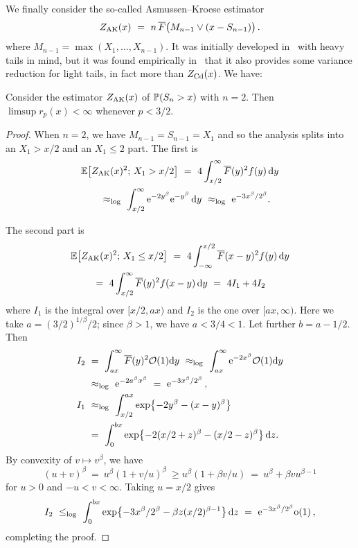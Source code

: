 We finally consider the so-called Asmussen--Kroese estimator
\begin{equation}\label{asmussen2006improved}
Z_{\rm AK}(x)\ =\ n\,\overline F\bigl(M_{n-1}\vee(x-S_{n-1})\bigr)\,.
\end{equation}
where $M_{n-1}=\max(X_1,\ldots,X_{n-1})$. It was initially developed in~\cite{asmussen2006improved} with heavy tails
in mind, but it was found empirically in~\cite{asmussen2017conditional} that it also provides some
variance reduction for light tails, in fact more than $Z_{\rm Cd}(x)$. We have:\\
\begin{proposition}\label{Prop:SA7.2b} Consider the 
estimator $Z_{\rm AK}(x)$ of $\mathbb{P}(S_n>x)$ with $n=2$. Then
$\limsup r_p(x)<\infty$ whenever $p<3/2$. 
\end{proposition}
\begin{proof} When $n=2$, we have $M_{n-1}=S_{n-1}=X_1$ and so the analysis
splits into an $X_1>x/2$ and an $X_1\le 2$ part. The first is
\begin{align*}\MoveEqLeft
 \Exp\bigl[Z_{\rm AK}(x)^2;\,X_1>x/2\bigr]\ =\ 4\int_{x/2}^\infty
 \Fb(y)^2f(y)\,\dd y\\ & \approx_{\log}\ \int_{x/2}^\infty
\e^{-2y^\beta}\e^{-y^\beta}\,\dd y\  \approx_{\log}\ \e^{-3x^\beta/2^\beta}.
\end{align*}

The second part is
\begin{align*}\MoveEqLeft
 \Exp\bigl[Z_{\rm AK}(x)^2;\,X_1\le x/2\bigr]\ =\ 4\int_{-\infty}^{x/2}
 \Fb(x-y)^2f(y)\,\dd y\\ &  \ =\ 4\int_{x/2}^\infty
 \Fb(y)^2f(x-y)\,\dd y\ = \ 4I_1+4I_2
\end{align*}
where $I_1$ is the integral over $[x/2,ax)$ and $I_2$ is the one over $[ax,\infty)$.
Here we take
$a=(3/2)^{1/\beta}/2$; 
since $\beta>1$, we have $a<3/4<1$. Let further $b=a-1/2$. Then
\begin{align*}
I_2\ &=\ \int_{ ax}^\infty  \Fb(y)^2\Oh(1)\dd y\ \approx_{\log} \ \int_{ ax}^\infty  \e^{-2x^\beta}\Oh(1)\dd y\\
 &\approx_{\log}\    \e^{-2a^\beta x^\beta}\ =\  \e^{-3 x^\beta/2^\beta}\,,\\
I_1\ &\approx_{\log}\ \int_{x/2}^{ ax} \exp\bigl\{-2y^\beta-(x-y)^\beta\bigr\}\\& =\ 
\int_0^{ bx} \exp\bigl\{-2(x/2+z)^\beta-(x/2-z)^\beta\bigr\}\,\dd z .
\end{align*}
By convexity of $v\mapsto v^\beta$, we have \[(u+v)^\beta\ =\ u^\beta(1+v/u)^\beta \ \ge u^\beta(1+\beta v/u)\ =\ 
 u^\beta+\beta v  u^{\beta-1}\]
 for $u>0$ and $-u<v<\infty$. Taking $u=x/2$ gives %
 \begin{align*}I_2\ \le_{\log}\ \int_0^{ bx} \exp\bigl\{-3x^\beta/2^\beta-\beta z(x/2)^{\beta-1}\bigr\}\,\mathrm{d} z\ =\
 \mathrm{e}^{-3 x^\beta/2^\beta}{\mathrm{o}}(1)\,,
 \end{align*}
 completing the proof.
 \end{proof}

